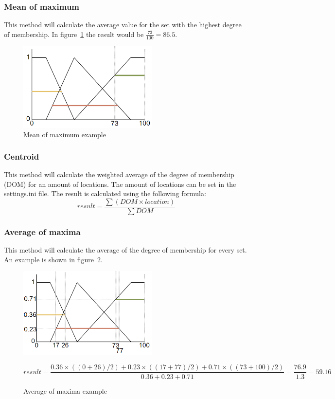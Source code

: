 \documentclass[10pt]{extarticle} %
\begin{document}
   \subsubsection {Mean of maximum}  
   This method will calculate the average value for the set with the highest degree of membership. In figure~\ref{fig:MOM} the result would be \(\frac{73}{100}=86.5\). 
   \begin{figure}[h!]
   \begin{center}
   \includegraphics[width=7cm]{MOM.png}
   \end{center}
   \caption{Mean of maximum example}
   \label{fig:MOM}
   \end{figure}
   \subsubsection {Centroid}  
   This method will calculate the weighted average of the degree of membership (DOM) for an amount of locations. The amount of locations can be set in the settings.ini file.
   The result is calculated using the following formula:
   \[ result = \frac{\sum (DOM \times location)}{\sum DOM} \]
   
   \subsubsection {Average of maxima}  
   This method will calculate the average of the degree of membership for every set. An example is shown in figure~\ref{fig:maxAv}.
   \begin{figure}[h!]
   \begin{center}
   \includegraphics[width=7cm]{maxAv.png}
   \end{center}
   \[ result = \frac{0.36 \times ((0 + 26) / 2) + 0.23 \times ((17 + 77) / 2) + 0.71 \times ((73 + 100) / 2)}{0.36 + 0.23 + 0.71} = \frac{76.9}{1.3} = {59.16}\]
   \caption{Average of maxima example}
   \label{fig:maxAv}
   \end{figure}
   
\end{document}
